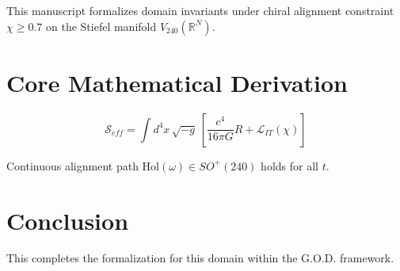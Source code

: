 \documentclass[11pt]{article}
\theoremstyle{definition}
\begin{document}
This manuscript formalizes domain invariants under chiral alignment constraint $\chi \ge 0.7$ on the Stiefel manifold $V_{240}(\mathbb{R}^N)$.

\section{Core Mathematical Derivation}
\begin{equation}
\mathcal{S}_{eff} = \int d^4x\,\sqrt{-g}\,\left[ \frac{c^4}{16\pi G} R + \mathcal{L}_{IT}(\chi) \right]
\end{equation}

\begin{theorem}
Continuous alignment path $\text{Hol}(\omega) \in SO^+(240)$ holds for all $t$.
\end{theorem}

\section{Conclusion}
This completes the formalization for this domain within the G.O.D. framework.
\end{document}
